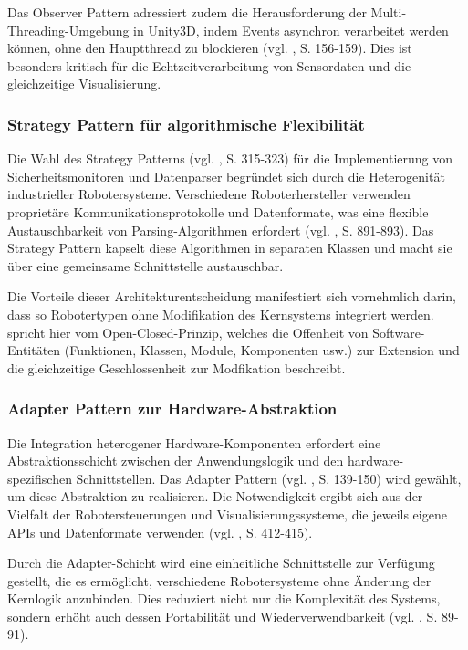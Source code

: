 Das Observer Pattern adressiert zudem die Herausforderung der
Multi-Threading-Umgebung in Unity3D, indem Events asynchron verarbeitet werden
können, ohne den Hauptthread zu blockieren (vgl. \cite{Nystrom2014}, S.
156-159). Dies ist besonders kritisch für die Echtzeitverarbeitung von
Sensordaten und die gleichzeitige Visualisierung.

\subsubsection{Strategy Pattern für algorithmische Flexibilität}
Die Wahl des Strategy Patterns (vgl. \cite{Gamma1994}, S. 315-323) für die
Implementierung von Sicherheitsmonitoren und Datenparser begründet sich durch
die Heterogenität industrieller Robotersysteme. Verschiedene Roboterhersteller
verwenden proprietäre Kommunikationsprotokolle und Datenformate, was eine
flexible Austauschbarkeit von Parsing-Algorithmen erfordert (vgl.
\cite{Siciliano2016}, S. 891-893). Das Strategy Pattern kapselt diese
Algorithmen in separaten Klassen und macht sie über eine gemeinsame
Schnittstelle austauschbar.

Die Vorteile dieser Architekturentscheidung manifestiert sich vornehmlich
darin, dass so Robotertypen ohne Modifikation des Kernsystems integriert
werden. \citeauthor{Martin2003} spricht hier vom Open-Closed-Prinzip, welches
die Offenheit von Software-Entitäten (Funktionen, Klassen, Module, Komponenten
usw.) zur Extension und die gleichzeitige Geschlossenheit zur Modfikation
beschreibt.

\subsubsection{Adapter Pattern zur Hardware-Abstraktion}
Die Integration heterogener Hardware-Komponenten erfordert eine
Abstraktionsschicht zwischen der Anwendungslogik und den hardware-spezifischen
Schnittstellen. Das Adapter Pattern (vgl. \cite{Gamma1994}, S. 139-150) wird
gewählt, um diese Abstraktion zu realisieren. Die Notwendigkeit ergibt sich aus
der Vielfalt der Robotersteuerungen und Visualisierungssysteme, die jeweils
eigene APIs und Datenformate verwenden (vgl. \cite{Craig2005}, S. 412-415).

Durch die Adapter-Schicht wird eine einheitliche Schnittstelle zur Verfügung
gestellt, die es ermöglicht, verschiedene Robotersysteme ohne Änderung der
Kernlogik anzubinden. Dies reduziert nicht nur die Komplexität des Systems,
sondern erhöht auch dessen Portabilität und Wiederverwendbarkeit (vgl.
\cite{Vlissides1995}, S. 89-91).

